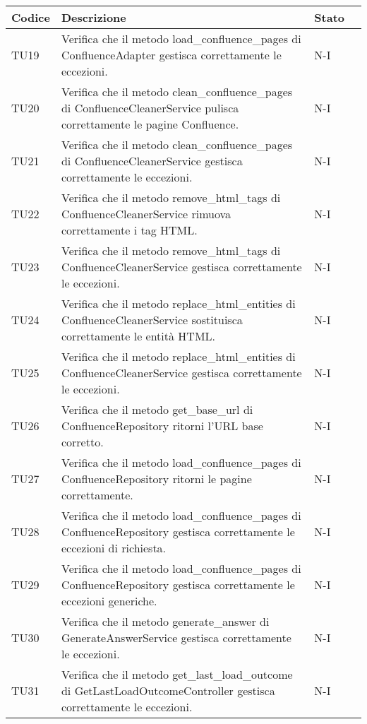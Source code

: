 \begin{table}[h!]
    \centering
    \renewcommand{\arraystretch}{1.5}
    \begin{tabularx}{\textwidth}{|p{}|X|p{}|p{}|}\hline
    \rowcolor[HTML]{FFD700}
    \textbf{Codice} & \textbf{Descrizione} & \textbf{Stato} \\ \hline
    TU19 & Verifica che il metodo load\_confluence\_pages di ConfluenceAdapter gestisca correttamente le eccezioni. &  N-I \\ \hline
    TU20 & Verifica che il metodo clean\_confluence\_pages di ConfluenceCleanerService pulisca correttamente le pagine Confluence. &  N-I \\ \hline
    TU21 & Verifica che il metodo clean\_confluence\_pages di ConfluenceCleanerService gestisca correttamente le eccezioni. &  N-I \\ \hline
    TU22 & Verifica che il metodo remove\_html\_tags di ConfluenceCleanerService rimuova correttamente i tag HTML. &  N-I \\ \hline
    TU23 & Verifica che il metodo remove\_html\_tags di ConfluenceCleanerService gestisca correttamente le eccezioni. &  N-I \\ \hline
    TU24 & Verifica che il metodo replace\_html\_entities di ConfluenceCleanerService sostituisca correttamente le entità HTML. &  N-I \\ \hline
    TU25 & Verifica che il metodo replace\_html\_entities di ConfluenceCleanerService gestisca correttamente le eccezioni. &  N-I \\ \hline
    TU26 & Verifica che il metodo get\_base\_url di ConfluenceRepository ritorni l'URL base corretto. &  N-I \\ \hline
    TU27 & Verifica che il metodo load\_confluence\_pages di ConfluenceRepository ritorni le pagine correttamente. &  N-I \\ \hline
    TU28 &  Verifica che il metodo load\_confluence\_pages di ConfluenceRepository gestisca correttamente le eccezioni di richiesta. &  N-I \\ \hline
    TU29 & Verifica che il metodo load\_confluence\_pages di ConfluenceRepository gestisca correttamente le eccezioni generiche. &  N-I \\ \hline
    TU30 & Verifica che il metodo generate\_answer di GenerateAnswerService gestisca correttamente le eccezioni. &  N-I \\ \hline
    TU31 & Verifica che il metodo get\_last\_load\_outcome di GetLastLoadOutcomeController gestisca correttamente le eccezioni. &  N-I \\ \hline

\end{tabularx}
\end{table}
